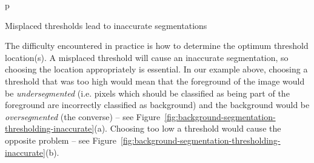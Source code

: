 \begin{stusubfig}{p}
	\hspace{4mm}%
\caption{Misplaced thresholds lead to inaccurate segmentations}
\label{fig:background-segmentation-thresholding-inaccurate}
\end{stusubfig}

\afterpage{\clearpage}

The difficulty encountered in practice is how to determine the optimum threshold location(s). A misplaced threshold will cause an inaccurate segmentation, so choosing the location appropriately is essential. In our example above, choosing a threshold that was too high would mean that the foreground of the image would be \emph{undersegmented} (i.e. pixels which should be classified as being part of the foreground are incorrectly classified as background) and the background would be \emph{oversegmented} (the converse) -- see Figure~\ref{fig:background-segmentation-thresholding-inaccurate}(a). Choosing too low a threshold would cause the opposite problem -- see Figure~\ref{fig:background-segmentation-thresholding-inaccurate}(b).

